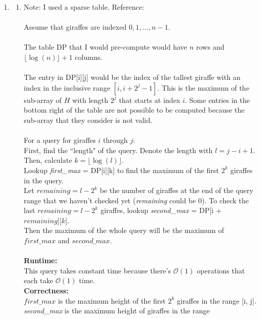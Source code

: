 \documentclass{article}
\begin{document}
\begin{enumerate}
    
    \newpage
    \item %
    \begin{enumerate}
        \item 
        Note: I used a sparse table. Reference: \href{https://www.youtube.com/watch?v=c5O7E_PDO4U&ab_channel=TusharRoy-CodingMadeSimple}{\color{blue}{Click Here}}\\
        \\
        Assume that giraffes are indexed $0, 1, ..., n - 1$.\\
        \\
        The table DP that I would pre-compute would have $n$ rows and $\lfloor \log(n) \rfloor + 1$ columns.\\
        \\
        The entry in DP[i][j] would be the index of the tallest giraffe with an index in the inclusive range $[i, i + 2^j - 1]$. This is the maximum of the sub-array of $H$ with length $2^j$ that starts at index $i$. Some entries in the bottom right of the table are not possible to be computed because the sub-array that they consider is not valid.\\
        \\
        For a query for giraffes $i$ through $j$:\\ First, find the ``length" of the query. Denote the length with $l = j - i + 1$.\\ Then, calculate $k = \lfloor \log(l)\rfloor$.\\ Lookup \textit{first\_max} = DP[i][k] to find the maximum of the first $2^k$ giraffes in the query.\\ Let $remaining = l - 2^k$ be the number of giraffes at the end of the query range that we haven't checked yet (\textit{remaining} could be 0). To check the last $remaining = l - 2^k$ giraffes, lookup \textit{second\_max} = DP[i + $remaining$][$k$].\\ Then the maximum of the whole query will be the maximum of $first\_max$ and $second\_max$. \\ \\ \textbf{Runtime:} \\This query takes constant time because there's $\mathcal{O}(1)$ operations that each take $\mathcal{O}(1)$ time. \\ \textbf{Correctness:} \\ $first\_max$ is the maximum height of the first $2^k$ giraffes in the range [i, j]. \textit{second\_max} is the maximum height of giraffes in the range\begin{align*}

\end{align*}
\end{enumerate}
\end{enumerate}
\end{document}
